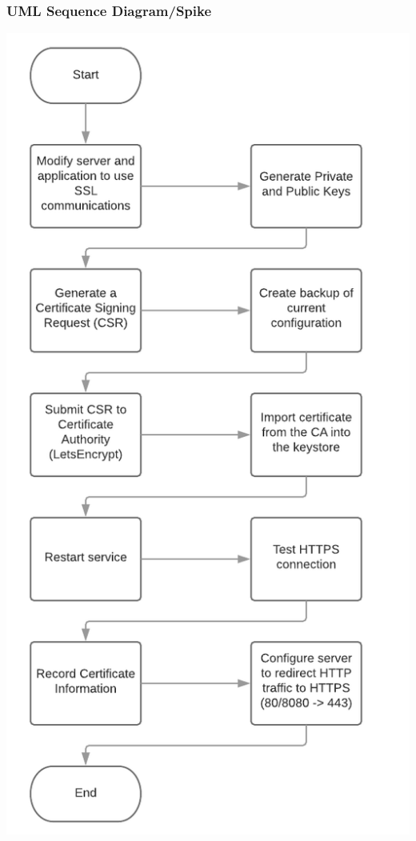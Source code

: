 \documentclass[12pt]{article}
\begin{document}
\subsubsection{UML Sequence Diagram/Spike}
\includegraphics[scale=0.5]{img/14.png}\linebreak
\end{document}
